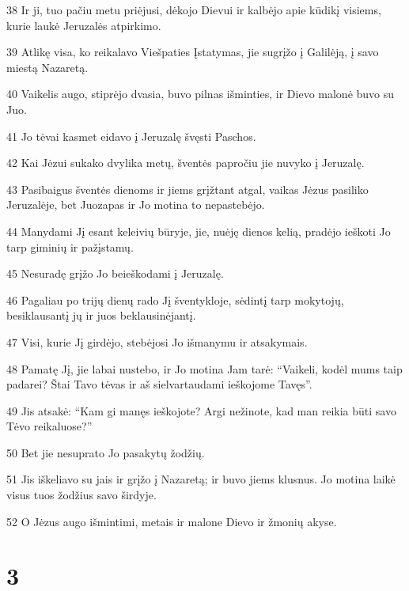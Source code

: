 \par 38 Ir ji, tuo pačiu metu priėjusi, dėkojo Dievui ir kalbėjo apie kūdikį visiems, kurie laukė Jeruzalės atpirkimo. 
\par 39 Atlikę visa, ko reikalavo Viešpaties Įstatymas, jie sugrįžo į Galilėją, į savo miestą Nazaretą. 
\par 40 Vaikelis augo, stiprėjo dvasia, buvo pilnas išminties, ir Dievo malonė buvo su Juo. 
\par 41 Jo tėvai kasmet eidavo į Jeruzalę švęsti Paschos. 
\par 42 Kai Jėzui sukako dvylika metų, šventės papročiu jie nuvyko į Jeruzalę. 
\par 43 Pasibaigus šventės dienoms ir jiems grįžtant atgal, vaikas Jėzus pasiliko Jeruzalėje, bet Juozapas ir Jo motina to nepastebėjo. 
\par 44 Manydami Jį esant keleivių būryje, jie, nuėję dienos kelią, pradėjo ieškoti Jo tarp giminių ir pažįstamų. 
\par 45 Nesuradę grįžo Jo beieškodami į Jeruzalę. 
\par 46 Pagaliau po trijų dienų rado Jį šventykloje, sėdintį tarp mokytojų, besiklausantį jų ir juos beklausinėjantį. 
\par 47 Visi, kurie Jį girdėjo, stebėjosi Jo išmanymu ir atsakymais. 
\par 48 Pamatę Jį, jie labai nustebo, ir Jo motina Jam tarė: “Vaikeli, kodėl mums taip padarei? Štai Tavo tėvas ir aš sielvartaudami ieškojome Tavęs”. 
\par 49 Jis atsakė: “Kam gi manęs ieškojote? Argi nežinote, kad man reikia būti savo Tėvo reikaluose?” 
\par 50 Bet jie nesuprato Jo pasakytų žodžių. 
\par 51 Jis iškeliavo su jais ir grįžo į Nazaretą; ir buvo jiems klusnus. Jo motina laikė visus tuos žodžius savo širdyje. 
\par 52 O Jėzus augo išmintimi, metais ir malone Dievo ir žmonių akyse.



\chapter{3}


